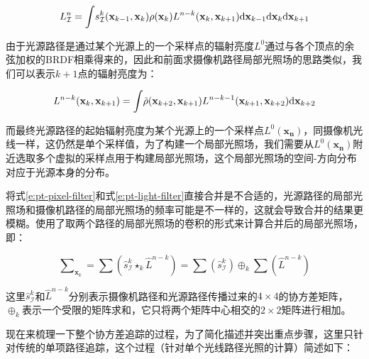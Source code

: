 \begin{equation}
	L^{n}_\mathcal{I}={\rm \int} s^{k}_{\mathcal{I}}(\mathbf{x}_{k-1},\mathbf{x}_k)\rho (\mathbf{x}_k)L^{n-k}(\mathbf{x}_{k},\mathbf{x}_{k+1}){\rm d}\mathbf{x}_{k-1}{\rm d}\mathbf{x}_{k}{\rm d}\mathbf{x}_{k+1}
\end{equation}

\noindent 由于光源路径是通过某个光源上的一个采样点的辐射亮度$L^{0}$通过与各个顶点的余弦加权的BRDF相乘得来的，因此和前面求摄像机路径局部光照场的思路类似，我们可以表示$k+1$点的辐射亮度为：

\begin{equation}\label{e:pt-light-filter}
\begin{aligned}
	L^{n-k}(\mathbf{x}_{k},\mathbf{x}_{k+1})={\rm \int} \tilde{\rho}(\mathbf{x}_{k+2},\mathbf{x}_{k+1})  L^{n-k-1}(\mathbf{x}_{k+1},\mathbf{x}_{k+2}){\rm d}\mathbf{x}_{k+2}
\end{aligned}
\end{equation}

\noindent 而最终光源路径的起始辐射亮度为某个光源上的一个采样点$L^{0}(\mathbf{x_n})$，同摄像机光线一样，这仍然是单个采样值，为了构建一个局部光照场，我们需要从$L^{0}(\mathbf{x_n})$附近选取多个虚拟的采样点用于构建局部光照场，这个局部光照场的空间-方向分布对应于光源本身的分布。

将式\ref{e:pt-pixel-filter}和式\ref{e:pt-light-filter}直接合并是不合适的，光源路径的局部光照场和摄像机路径的局部光照场的频率可能是不一样的，这就会导致合并的结果更模糊。\cite{a:AntialiasingComplexGlobalIlluminationEffectsinPath-space}使用了取两个路径的局部光照场的卷积的形式来计算合并后的局部光照场，即：

\begin{equation}
	\sum\nolimits_{\mathbf{x}_k}=\sum (\hat{s}^{k}_{\mathcal{I}}\star_k \hat{L}^{n-k})=\sum(\hat{s}^{k}_{\mathcal{I}})\oplus_k\sum(\hat{L}^{n-k})
\end{equation}

\noindent 这里$\hat{s}^{k}_{\mathcal{I}}$和$\hat{L}^{n-k}$分别表示摄像机路径和光源路径传播过来的$4\times 4$的协方差矩阵，$\oplus_k$表示一个受限的矩阵求和，它只将两个矩阵中心相交的$2\times 2$矩阵进行相加。

现在来梳理一下整个协方差追踪的过程，为了简化描述并突出重点步骤，这里只针对传统的单项路径追踪，这个过程（针对单个光线路径光照的计算）简述如下：

